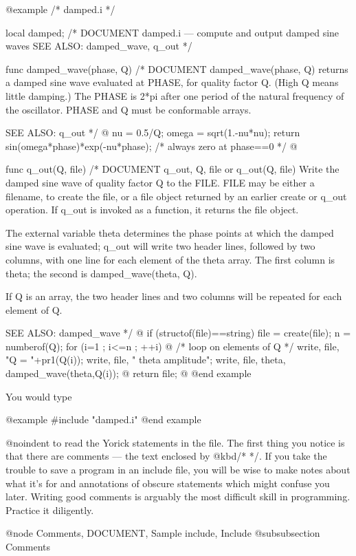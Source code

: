 {@example
/* damped.i */

local damped;
/* DOCUMENT damped.i --- compute and output damped sine waves
   SEE ALSO: damped_wave, q_out
 */

func damped_wave(phase, Q)
/* DOCUMENT damped_wave(phase, Q)
     returns a damped sine wave evaluated at PHASE, for quality factor Q.
     (High Q means little damping.)  The PHASE is 2*pi after one period of
     the natural frequency of the oscillator.  PHASE and Q must be
     conformable arrays.

   SEE ALSO: q_out
 */
@{
  nu = 0.5/Q;
  omega = sqrt(1.-nu*nu);
  return sin(omega*phase)*exp(-nu*phase);  /* always zero at phase==0 */
@}

func q_out(Q, file)
/* DOCUMENT q_out, Q, file
         or q_out(Q, file)
     Write the damped sine wave of quality factor Q to the FILE.
     FILE may be either a filename, to create the file, or a file
     object returned by an earlier create or q_out operation.  If
     q_out is invoked as a function, it returns the file object.

     The external variable
          theta
     determines the phase points at which the damped sine wave is
     evaluated; q_out will write two header lines, followed by
     two columns, with one line for each element of the theta
     array.  The first column is theta; the second is
     damped_wave(theta, Q).

     If Q is an array, the two header lines and two columns will
     be repeated for each element of Q.

   SEE ALSO: damped_wave
 */
@{
  if (structof(file)==string) file = create(file);
  n = numberof(Q);
  for (i=1 ; i<=n ; ++i) @{ /* loop on elements of Q */
    write, file, "Q = "+pr1(Q(i));
    write, file, "   theta       amplitude";
    write, file, theta, damped_wave(theta,Q(i));
  @}
  return file;
@}
@end example

You would type

@example
#include "damped.i"
@end example

@noindent
to read the Yorick statements in the file.  The first thing you notice
is that there are comments --- the text enclosed by @kbd{/* */}.  If
you take the trouble to save a program in an include file, you will be
wise to make notes about what it's for and annotations of obscure
statements which might confuse you later.  Writing good comments is
arguably the most difficult skill in programming.  Practice it
diligently.


@node Comments, DOCUMENT, Sample include, Include
@subsubsection Comments

}
